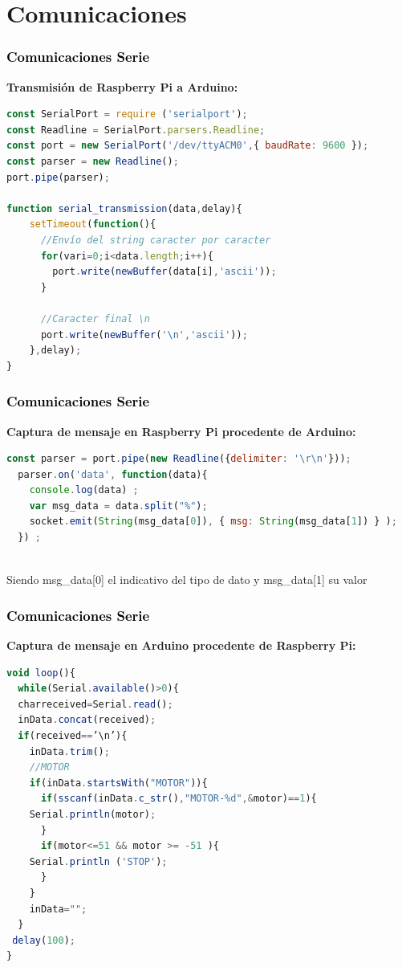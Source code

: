 \documentclass[xcolor=x11names,compress]{beamer}
\theoremstyle{cuadrado}
\begin{document}
\section{Comunicaciones}

\begin{frame}[fragile]
\frametitle{\textcolor{black}{ Comunicaciones Serie }}
\textbf{Transmisión de Raspberry Pi a Arduino:}
\begin{lstlisting}[language=JavaScript]
const SerialPort = require ('serialport');
const Readline = SerialPort.parsers.Readline;
const port = new SerialPort('/dev/ttyACM0',{ baudRate: 9600 });
const parser = new Readline();
port.pipe(parser);

function serial_transmission(data,delay){
	setTimeout(function(){
	  //Envío del string caracter por caracter
	  for(vari=0;i<data.length;i++){
	    port.write(newBuffer(data[i],'ascii'));
	  }

	  //Caracter final \n
	  port.write(newBuffer('\n','ascii'));
	},delay);
}

\end{lstlisting}

\end{frame}


\begin{frame}[fragile]
\frametitle{\textcolor{black}{ Comunicaciones Serie }}
\textbf{Captura de mensaje en Raspberry Pi procedente de Arduino:}

  \begin{lstlisting}[language=JavaScript]
  const parser = port.pipe(new Readline({delimiter: '\r\n'}));
  parser.on('data', function(data){
    console.log(data) ;
    var msg_data = data.split("%");
    socket.emit(String(msg_data[0]), { msg: String(msg_data[1]) } );
  }) ;

  \end{lstlisting}
    
  \\  
  Siendo msg\_data[0] el indicativo del tipo de dato y msg\_data[1] su valor
    
\end{frame}



\begin{frame}[fragile]
\frametitle{\textcolor{black}{ Comunicaciones Serie }}
\textbf{Captura de mensaje en Arduino procedente de Raspberry Pi:}
\begin{lstlisting}[language=JavaScript]
void loop(){
  while(Serial.available()>0){
  charreceived=Serial.read();
  inData.concat(received);
  if(received==’\n’){
    inData.trim();
    //MOTOR
    if(inData.startsWith("MOTOR")){
      if(sscanf(inData.c_str(),"MOTOR-%d",&motor)==1){
	Serial.println(motor);
      }
      if(motor<=51 && motor >= -51 ){
	Serial.println ('STOP');
      }
    }
    inData="";
  }
 delay(100);
}
\end{lstlisting}

\end{frame}
\end{document}
